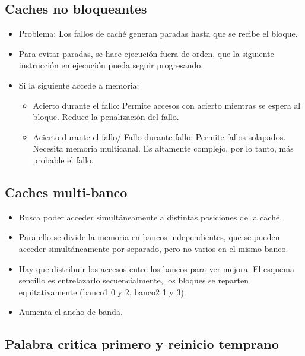 \documentclass[12pt, twoside, openright]{report} %
\begin{document}
  \subsection{Caches no bloqueantes}

    \begin{itemize}
    
    \item
      Problema: Los fallos de caché generan paradas hasta que se recibe
      el bloque.
    \item
      Para evitar paradas, se hace ejecución fuera de orden, que la
      siguiente instrucción en ejecución pueda seguir progresando.
    \item
      Si la siguiente accede a memoria:

      \begin{itemize}
      
      \item
        Acierto durante el fallo: Permite accesos con acierto mientras
        se espera al bloque. Reduce la penalización del fallo.
      \item
        Acierto durante el fallo/ Fallo durante fallo: Permite fallos
        solapados. Necesita memoria multicanal. Es altamente complejo,
        por lo tanto, más probable el fallo.
      \end{itemize}
    \end{itemize}
  \subsection{Caches multi-banco}

    \begin{itemize}
    
    \item
      Busca poder acceder simultáneamente a distintas posiciones de la
      caché.
    \item
      Para ello se divide la memoria en bancos independientes, que se
      pueden acceder simultáneamente por separado, pero no varios en el
      mismo banco.
    \item
      Hay que distribuir los accesos entre los bancos para ver mejora.
      El esquema sencillo es entrelazarlo secuencialmente, los bloques
      se reparten equitativamente (banco1 0 y 2, banco2 1 y 3).
    \item
      Aumenta el ancho de banda.
    \end{itemize}
  \subsection{Palabra critica primero y reinicio temprano}
\end{document}
